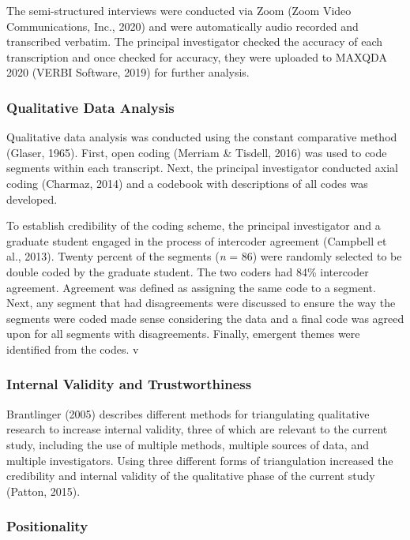 \documentclass{sig-alternate} %
\begin{document}
\begin{large}
The semi-structured interviews were conducted via Zoom (Zoom Video Communications, Inc., 2020) and were automatically audio recorded and transcribed verbatim. The principal investigator checked the accuracy of each transcription and once checked for accuracy, they were uploaded to MAXQDA 2020 (VERBI Software, 2019) for further analysis.

\subsubsection*{Qualitative Data Analysis}

Qualitative data analysis was conducted using the constant comparative method (Glaser, 1965). First, open coding (Merriam \& Tisdell, 2016) was used to code segments within each transcript. Next, the principal investigator conducted axial coding (Charmaz, 2014) and a codebook with descriptions of all codes was developed. 

To establish credibility of the coding scheme, the principal investigator and a graduate student engaged in the process of intercoder agreement (Campbell et al., 2013). Twenty percent of the segments (\textit{n} = 86) were randomly selected to be double coded by the graduate student. The two coders had 84\% intercoder agreement. Agreement was defined as assigning the same code to a segment. Next, any segment that had disagreements were discussed to ensure the way the segments were coded made sense considering the data and a final code was agreed upon for all segments with disagreements. Finally, emergent themes were identified from the codes. v

\subsubsection*{Internal Validity and Trustworthiness}

Brantlinger (2005) describes different methods for triangulating qualitative research to increase internal validity, three of which are relevant to the current study, including the use of multiple methods, multiple sources of data, and multiple investigators. Using three different forms of triangulation increased the credibility and internal validity of the qualitative phase of the current study (Patton, 2015). 

\subsubsection*{Positionality}


\end{large}
\end{document}
